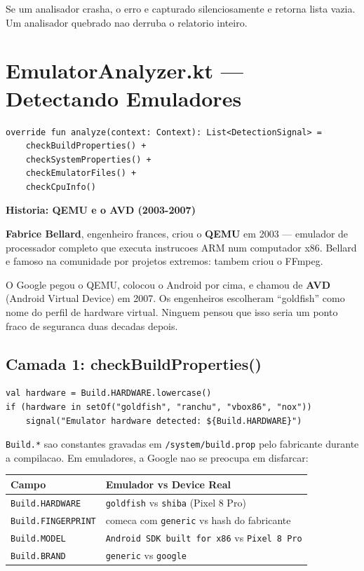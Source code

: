 \documentclass[12pt,a4paper]{article}
\begin{document}
Se um analisador crasha, o erro e capturado silenciosamente e retorna lista vazia.
Um analisador quebrado nao derruba o relatorio inteiro.

\newpage

\section{EmulatorAnalyzer.kt --- Detectando Emuladores}

\begin{lstlisting}
override fun analyze(context: Context): List<DetectionSignal> =
    checkBuildProperties() +
    checkSystemProperties() +
    checkEmulatorFiles() +
    checkCpuInfo()
\end{lstlisting}

\begin{historybox}
\textbf{Historia: QEMU e o AVD (2003-2007)}

\textbf{Fabrice Bellard}, engenheiro frances, criou o \textbf{QEMU} em 2003 ---
emulador de processador completo que executa instrucoes ARM num computador x86.
Bellard e famoso na comunidade por projetos extremos: tambem criou o FFmpeg.

O Google pegou o QEMU, colocou o Android por cima, e chamou de \textbf{AVD}
(Android Virtual Device) em 2007. Os engenheiros escolheram ``goldfish'' como
nome do perfil de hardware virtual. Ninguem pensou que isso seria um ponto
fraco de seguranca duas decadas depois.
\end{historybox}

\subsection{Camada 1: checkBuildProperties()}

\begin{lstlisting}
val hardware = Build.HARDWARE.lowercase()
if (hardware in setOf("goldfish", "ranchu", "vbox86", "nox"))
    signal("Emulator hardware detected: ${Build.HARDWARE}")
\end{lstlisting}

\texttt{Build.*} sao constantes gravadas em \texttt{/system/build.prop} pelo
fabricante durante a compilacao. Em emuladores, a Google nao se preocupa em
disfarcar:

\begin{center}
\begin{tabular}{ll}
\toprule
Campo & Emulador vs Device Real \\
\midrule
\texttt{Build.HARDWARE} & \texttt{goldfish} vs \texttt{shiba} (Pixel 8 Pro) \\
\texttt{Build.FINGERPRINT} & comeca com \texttt{generic} vs hash do fabricante \\
\texttt{Build.MODEL} & \texttt{Android SDK built for x86} vs \texttt{Pixel 8 Pro} \\
\texttt{Build.BRAND} & \texttt{generic} vs \texttt{google} \\
\bottomrule
\end{tabular}
\end{center}
\end{document}

